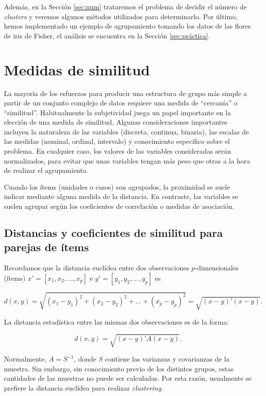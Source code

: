 \documentclass[a4paper, 20pt]{article}
\begin{document}
Además, en la Sección \ref{sec:num} trataremos el problema de decidir el número de \textit{clusters} y veremos algunos métodos utilizados para determinarlo. Por último, hemos implementado un ejemplo de agrupamiento tomando los datos de las flores de iris de Fisher, el análisis se encuentra en la Sección \ref{sec:práctica}. %

\section{Medidas de similitud}\label{sec:medidas}

La mayoría de los esfuerzos para producir una estructura de grupo más simple a partir de un conjunto complejo de datos requiere una medida de ``cercanía'' o  ``similitud''. Habitualmente la subjetividad juega un papel importante en la elección de una medida de similitud, Algunas consideraciones importantes incluyen la naturaleza de las variables (discreta, continua, binaria), las escalas de las medidas (nominal, ordinal, intervalo) y conocimiento específico sobre el problema. En cualquier caso, los valores de las variables consideradas serán normalizados, para evitar que unas variables tengan más peso que otras a la hora de realizar el agrupamiento.

Cuando los ítems (unidades o casos) son agrupados, la proximidad se suele indicar mediante alguna medida de la distancia. En contraste, las variables se suelen agrupar según los coeficientes de correlación o medidas de asociación.

\subsection{Distancias y coeficientes de similitud para parejas de ítems}

Recordamos que la distancia euclídea entre dos observaciones $p$-dimensionales (ítems) $x' = [x_1,x_2,...,x_p]$ e $y'=[y_1,y_2,...,y_p]$ es

\[d(x,y) = \sqrt{(x_1-y_1)^2+(x_2-y_2)^2+...+(x_p-y_p)^2}=\sqrt{(x-y)'(x-y)}.\]

La distancia estadística entre las mismas dos observaciones es de la forma:

$$d(x,y)=\sqrt{(x-y)'A(x-y)}. $$

Normalmente, $A=S^{-1}$, donde $S$ contiene las varianzas y covarianzas de la muestra. Sin embargo, sin conocimiento previo de los distintos grupos, estas cantidades de las muestras no puede ser calculadas. Por esta razón, usualmente se prefiere la distancia euclídea para realizar \textit{clustering}.\\
\end{document}
